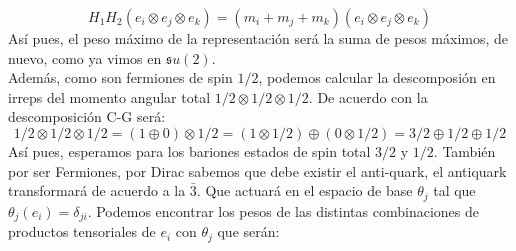 \documentclass[12pt]{article}
\begin{document}
$$H_1 H_2(e_i\otimes e_j\otimes e_k) = (m_i+m_j+m_k)(e_i\otimes e_j\otimes e_k)$$
Así pues, el peso máximo de la representación será la suma de pesos máximos,  de nuevo, como ya vimos en $\mathfrak{s}{u}(2)$.\\ 
Además, como son fermiones de spin $1/2$, podemos calcular la descomposión en irreps del momento angular total $1/2 \otimes 1/2 \otimes 1/2$. De acuerdo con la descomposición C-G será: 
$$1/2 \otimes 1/2 \otimes 1/2= (1\oplus0)\otimes1/2=(1\otimes1/2)\oplus(0\otimes1/2)=3/2\oplus1/2\oplus1/2$$
Así pues, esperamos para los bariones estados de spin total $3/2$ y $1/2$. También por ser Fermiones, por Dirac sabemos que debe existir el anti-quark, el antiquark transformará de acuerdo a la $\bar {3} $. Que actuará en el espacio de base $\theta_j$ tal que $\theta_j(e_i) =\delta_{ji}$. Podemos encontrar los pesos de las distintas combinaciones de productos tensoriales de $e_i$ con $\theta_j$ que serán:
\end{document}

